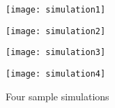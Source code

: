 \begin{figure}[h]
 
\begin{minipage}[h]{0.4\linewidth}
	\centering
	\texttt{[image: simulation1]}
	\end{minipage}
	
	\begin{minipage}[h]{0.4\linewidth}
	\centering
	\texttt{[image: simulation2]}
	\end{minipage}

	\begin{minipage}[h]{0.4\linewidth}
	\centering
	\texttt{[image: simulation3]}
	\end{minipage}
	
	\begin{minipage}[h]{0.4\linewidth}
	\centering
	\texttt{[image: simulation4]}
	\end{minipage}

\caption{Four sample simulations}
\label{fig:image2}
\end{figure}

